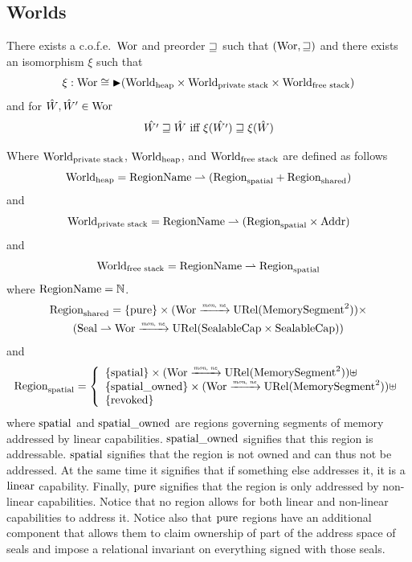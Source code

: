 \documentclass[a4paper]{article}
\begin{document}
\subsection{Worlds}
\label{subsec:worlds}
\begin{theorem}
  \label{thm:recursive-domain-eq}
  There exists a c.o.f.e.\ $\mathrm{Wor}$ and preorder $\sqsupseteq$ such that $(\mathrm{Wor},\sqsupseteq)$ and there exists an isomorphism $\xi$ such that
  \[
    \xi : \mathrm{Wor} \cong \mathop{\blacktriangleright} (\mathrm{World}_\mathrm{heap} \times \mathrm{World}_\text{private stack} \times \mathrm{World}_\text{free stack})
  \]
  and for $\hat{W},\hat{W}' \in \mathrm{Wor}$
  \[
    \hat{W'} \sqsupseteq \hat{W}\text{ iff }\xi(\hat{W'}) \sqsupseteq \xi(\hat{W})
  \]
\end{theorem}

Where $\mathrm{World}_\text{private stack}$, $\mathrm{World}_\mathrm{heap}$, and $\mathrm{World}_\text{free stack}$ are defined as follows
\[
  \mathrm{World}_\mathrm{heap} = \mathrm{RegionName} \rightharpoonup (\mathrm{Region}_\mathrm{spatial} + \mathrm{Region}_\mathrm{shared})
\]
and
\[
  \mathrm{World}_\text{private stack} = \mathrm{RegionName} \rightharpoonup (\mathrm{Region}_\mathrm{spatial} \times \mathrm{Addr})
\]
and
\[
  \mathrm{World}_\text{free stack} = \mathrm{RegionName} \rightharpoonup \mathrm{Region}_\mathrm{spatial}
\]
where $\mathrm{RegionName} = \mathbb{N}$.
\begin{multline*}
  \mathrm{Region}_\mathrm{shared} = 
  \{\mathrm{pure} \} \times (\mathrm{Wor} \xrightarrow{\textit{\tiny{mon, ne}}} \mathrm{URel}(\mathrm{MemorySegment}^2)) \times \\
  (\mathrm{Seal} \rightharpoonup \mathrm{Wor} \xrightarrow{\textit{\tiny{mon, ne}}} \mathrm{URel}(\mathrm{SealableCap} \times \mathrm{SealableCap}))
\end{multline*}
and
\[
  \mathrm{Region}_\mathrm{spatial} = \left\{
  \begin{array}{l}
    \{\mathrm{spatial} \} \times (\mathrm{Wor} \xrightarrow{\textit{\tiny{mon, ne}}} \mathrm{URel}(\mathrm{MemorySegment}^2)) \uplus \\
    \{\mathrm{spatial\_owned} \} \times (\mathrm{Wor} \xrightarrow{\textit{\tiny{mon, ne}}} \mathrm{URel}(\mathrm{MemorySegment}^2))\uplus \\ 
    \{\mathrm{revoked}\}
  \end{array} \right.
\]
where $\mathrm{spatial}$ and $\mathrm{spatial\_owned}$ are regions governing segments of memory addressed by linear capabilities.
$\mathrm{spatial\_owned}$ signifies that this region is addressable.
$\mathrm{spatial}$ signifies that the region is not owned and can thus not be addressed.
At the same time it signifies that if something else addresses it, it is a $\mathrm{linear}$ capability.
Finally, $\mathrm{pure}$ signifies that the region is only addressed by non-linear capabilities.
Notice that no region allows for both linear and non-linear capabilities to address it.
Notice also that $\mathrm{pure}$ regions have an additional component that allows them to claim ownership of part of the address space of seals and impose a relational invariant on everything signed with those seals.
\end{document}
